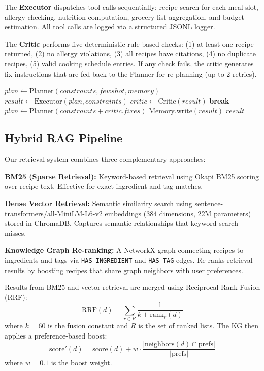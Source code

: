 \documentclass[11pt,twocolumn]{article}
\begin{document}
The \textbf{Executor} dispatches tool calls sequentially: recipe search for each meal slot, allergy checking, nutrition computation, grocery list aggregation, and budget estimation. All tool calls are logged via a structured JSONL logger.

The \textbf{Critic} performs five deterministic rule-based checks: (1) at least one recipe returned, (2) no allergy violations, (3) all recipes have citations, (4) no duplicate recipes, (5) valid cooking schedule entries. If any check fails, the critic generates fix instructions that are fed back to the Planner for re-planning (up to 2 retries).

\begin{algorithm}[H]
\caption{Planner-Executor-Critic Loop}
\begin{algorithmic}[1]
\State $plan \gets \text{Planner}(constraints, fewshot, memory)$
    \State $result \gets \text{Executor}(plan, constraints)$
    \State $critic \gets \text{Critic}(result)$
        \State \textbf{break}
    \EndIf
    \State $plan \gets \text{Planner}(constraints + critic.fixes)$
\EndFor
\State $\text{Memory.write}(result)$
\State \Return $result$
\end{algorithmic}
\end{algorithm}

\subsection{Hybrid RAG Pipeline}

Our retrieval system combines three complementary approaches:

\textbf{BM25 (Sparse Retrieval):} Keyword-based retrieval using Okapi BM25 scoring over recipe text. Effective for exact ingredient and tag matches.

\textbf{Dense Vector Retrieval:} Semantic similarity search using sentence-transformers/all-MiniLM-L6-v2 embeddings (384 dimensions, 22M parameters) stored in ChromaDB. Captures semantic relationships that keyword search misses.

\textbf{Knowledge Graph Re-ranking:} A NetworkX graph connecting recipes to ingredients and tags via \texttt{HAS\_INGREDIENT} and \texttt{HAS\_TAG} edges. Re-ranks retrieval results by boosting recipes that share graph neighbors with user preferences.

Results from BM25 and vector retrieval are merged using Reciprocal Rank Fusion (RRF):
\begin{equation}
\text{RRF}(d) = \sum_{r \in R} \frac{1}{k + \text{rank}_r(d)}
\end{equation}
where $k=60$ is the fusion constant and $R$ is the set of ranked lists. The KG then applies a preference-based boost:
\begin{equation}
\text{score}'(d) = \text{score}(d) + w \cdot \frac{|\text{neighbors}(d) \cap \text{prefs}|}{|\text{prefs}|}
\end{equation}
where $w=0.1$ is the boost weight.
\end{document}
